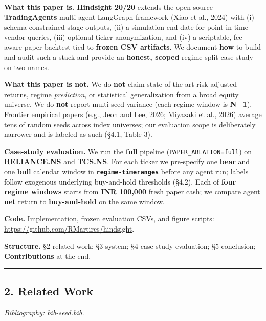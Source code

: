\documentclass[
]{article}
\begin{document}
\textbf{What this paper is.} \textbf{Hindsight 20/20} extends the
open-source \textbf{TradingAgents} multi-agent LangGraph framework (Xiao
et al., 2024) with (i) schema-constrained stage outputs, (ii) a
simulation end date for point-in-time vendor queries, (iii) optional
ticker anonymization, and (iv) a scriptable, fee-aware paper backtest
tied to \textbf{frozen CSV artifacts}. We document \textbf{how} to build
and audit such a stack and provide an \textbf{honest, scoped}
regime-split case study on two names.

\textbf{What this paper is not.} We do \textbf{not} claim
state-of-the-art risk-adjusted returns, regime \emph{prediction}, or
statistical generalization from a broad equity universe. We do
\textbf{not} report multi-seed variance (each regime window is
\textbf{N=1}). Frontier empirical papers (e.g., Jeon and Lee, 2026;
Miyazaki et al., 2026) average tens of random seeds across index
universes; our evaluation scope is deliberately narrower and is labeled
as such (§4.1, Table 3).

\textbf{Case-study evaluation.} We run the \textbf{full} pipeline
(\texttt{PAPER\_ABLATION=full}) on \textbf{RELIANCE.NS} and
\textbf{TCS.NS}. For each ticker we pre-specify one \textbf{bear} and
one \textbf{bull} calendar window in \textbf{\texttt{regime-timeranges}}
before any agent run; labels follow exogenous underlying buy-and-hold
thresholds (§4.2). Each of \textbf{four regime windows} starts from
\textbf{INR 100,000} fresh paper cash; we compare agent \textbf{net}
return to \textbf{buy-and-hold} on the same window.

\textbf{Code.} Implementation, frozen evaluation CSVs, and figure
scripts: \url{https://github.com/RMartires/hindsight}.

\textbf{Structure.} §2 related work; §3 system; §4 case study
evaluation; §5 conclusion; \textbf{Contributions} at the end.

\begin{center}\rule{0.5\linewidth}{0.5pt}\end{center}

\subsection{2. Related Work}\label{related-work}

\emph{Bibliography: \url{bib-seed.bib}.}
\end{document}
